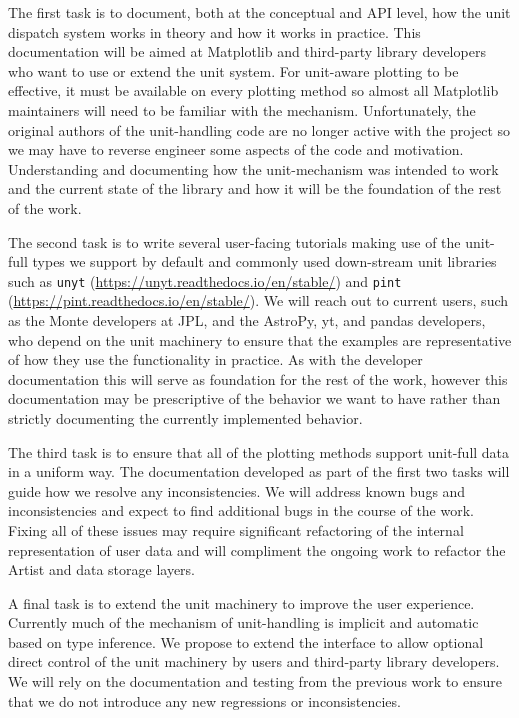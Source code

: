 \documentclass[12pt]{article}
\numberwithin{page}{section}
\begin{document}
The first task is to document, both at the conceptual and API level,
how the unit dispatch system works in theory and how it works in
practice.  This documentation will be aimed at Matplotlib and
third-party library developers who want to use or extend the unit
system.  For unit-aware plotting to be effective, it must be available
on every plotting method so almost all Matplotlib maintainers will
need to be familiar with the mechanism.  Unfortunately, the original
authors of the unit-handling code are no longer active with the
project so we may have to reverse engineer some aspects of the code
and motivation.  Understanding and documenting how the unit-mechanism
was intended to work and the current state of the library and how it
will be the foundation of the rest of the work.

The second task is to write several user-facing tutorials making use
of the unit-full types we support by default and commonly used
down-stream unit libraries such as \texttt{unyt}
(\url{https://unyt.readthedocs.io/en/stable/}) and \texttt{pint}
(\url{https://pint.readthedocs.io/en/stable/}).  We will reach out to
current users, such as the Monte developers at JPL, and the AstroPy,
yt, and pandas developers, who depend on the unit machinery to ensure
that the examples are representative of how they use the functionality
in practice.  As with the developer documentation this will serve as
foundation for the rest of the work, however this documentation may be
prescriptive of the behavior we want to have rather than strictly
documenting the currently implemented behavior.

The third task is to ensure that all of the plotting methods support
unit-full data in a uniform way.  The documentation developed as part
of the first two tasks will guide how we resolve any inconsistencies.
We will address known bugs and inconsistencies and expect to find
additional bugs in the course of the work.  Fixing all of these issues
may require significant refactoring of the internal representation of
user data and will compliment the ongoing work to refactor the Artist
and data storage layers.

A final task is to extend the unit machinery to improve the user
experience.  Currently much of the mechanism of unit-handling is
implicit and automatic based on type inference.  We propose to extend
the interface to allow optional direct control of the unit machinery
by users and third-party library developers.  We will rely on the
documentation and testing from the previous work to ensure that we do
not introduce any new regressions or inconsistencies.
\end{document}
